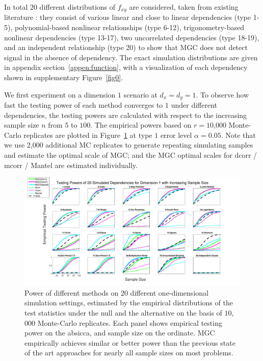 \documentclass[11pt]{article}
\begin{document}
In total $20$ different distributions of $f_{xy}$ are considered, taken from existing literature \cite{SzekelyRizzoBakirov2007, SimonTibshirani2012, GorfineHellerHeller2012, HellerGorfine2013}: they consist of various linear and close to linear dependencies (type 1-5), polynomial-based nonlinear relationships (type 6-12), trigonometry-based nonlinear dependencies (type 13-17), two uncorrelated dependencies (type 18-19), and an independent relationship (type 20) to show that MGC does not detect signal in the absence of dependency. The exact simulation distributions are given in appendix section~\ref{appen:function}, with a visualization of each dependency shown in supplementary Figure~\ref{fig0}.

We first experiment on a dimension $1$ scenario at $d_{x}=d_{y}=1$. To observe how fast the testing power of each method converges to $1$ under different dependencies, the testing powers are calculated with respect to the increasing sample size $n$ from $5$ to $100$. The empirical powers based on $r=10$,$000$ Monte-Carlo replicates are plotted in Figure~\ref{fig:1D} at type $1$ error level $\alpha=0.05$. Note that we use $2$,$000$ additional MC replicates to generate repeating simulating samples and estimate the optimal scale of MGC; and the MGC optimal scales for dcorr / mcorr / Mantel are estimated individually.

\begin{figure}[htbp]
\includegraphics[width=1.0\textwidth]{../Figures/Fig1}
\caption{
Power of different methods on 20 different one-dimensional simulation settings, estimated by the empirical distributions of the test statistics under the null and the alternative on the basis of $10$,$000$ Monte-Carlo replicates.
Each panel shows empirical testing power on the absicca, and sample size on the ordinate.
MGC empirically achieves similar or better power than the previous state of the art approaches for nearly all sample sizes on most problems.}
\label{fig:1D}
\end{figure}
\end{document}
